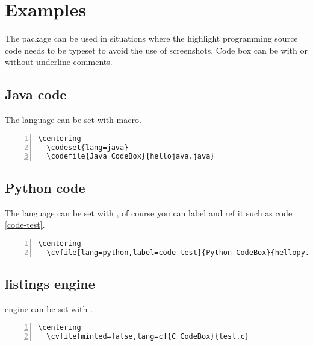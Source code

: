 \documentclass{ctxdoc-en}
\begin{document}
\section{Examples}

The  package can be used in situations
where the highlight programming source code needs to be typeset
to avoid the use of screenshots.
Code box can be with or without underline comments.

\newpage

\subsection{Java code}
The language can be set with  macro.

\begin{Verbatim}[frame=none,numbers=left,gobble=2]
  \centering
  \codeset{lang=java}
  \codefile{Java CodeBox}{hellojava.java}
\end{Verbatim}

\begin{center}
  \begin{minipage}{0.85\textwidth}
  \end{minipage}
\end{center}

\subsection{Python code}
The language can be set with , of course you can label and ref it
such as code \ref{code-test}.

\begin{Verbatim}[frame=none,numbers=left,gobble=2]
  \centering
  \cvfile[lang=python,label=code-test]{Python CodeBox}{hellopy.py}
\end{Verbatim}

\begin{center}
  \begin{minipage}{0.85\textwidth}
  \end{minipage}
\end{center}

\newpage

\subsection{listings engine}
 engine can be set with .

\begin{Verbatim}[frame=none,numbers=left,gobble=2]
  \centering
  \cvfile[minted=false,lang=c]{C CodeBox}{test.c}
\end{Verbatim}

\begin{center}
  \begin{minipage}{0.85\textwidth}
  \end{minipage}
\end{center}
\end{document}
